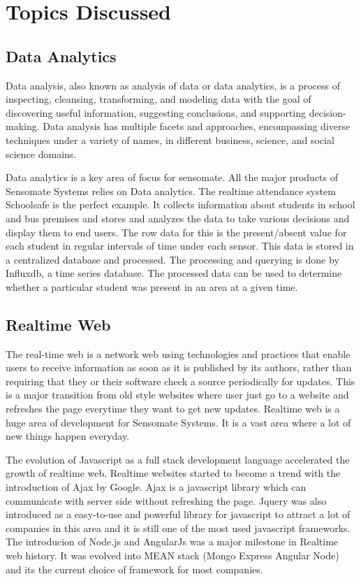 \documentclass[a4paper,12pt]{report}
\begin{document}
		\section{Topics Discussed}
			\subsection{Data Analytics}
			Data analysis, also known as analysis of data or data analytics, is a process of inspecting, cleansing, transforming, and modeling data with the goal of discovering useful information, suggesting conclusions, and supporting decision-making. Data analysis has multiple facets and approaches, encompassing diverse techniques under a variety of names, in different business, science, and social science domains.

			Data analytics is a key area of focus for sensomate. All the major products of Sensomate Systems relies on Data analytics. The realtime attendance system Schoolsafe is the perfect example. It collects information about students in school and bus premises and stores and analyzes the data to take various decisions and display them to end users. The row data for this is the present/absent value for each student in regular intervals of time under each sensor. This data is stored in a centralized database and processed. The processing and querying is done by Influxdb, a time series database. The processed data can be used to determine whether a particular student was present in an area at a given time.
			\subsection{Realtime Web}
			The real-time web is a network web using technologies and practices that enable users to receive information as soon as it is published by its authors, rather than requiring that they or their software check a source periodically for updates. This is a major transition from old style websites where user just go to a website and refreshes the page everytime they want to get new updates. Realtime web is a huge area of development for Sensomate Systems. It is a vast area where a lot of new things happen everyday.

			The evolution of Javascript as a full stack development language accelerated the growth of realtime web. Realtime websites started to become a trend with the introduction of Ajax by Google. Ajax is a javascript library which can communicate with server side without refreshing the page. Jquery was also introduced as a easy-to-use and powerful library for javascript to attract a lot of companies in this area and it is still one of the most used javascript frameworks. The introducion of Node.js and AngularJs was a major milestone in Realtime web history. It was evolved into MEAN stack (Mongo Express Angular Node) and its the current choice of framework for most companies.
\end{document}

